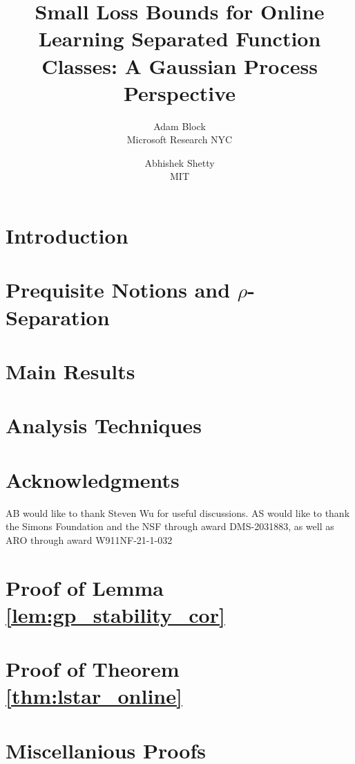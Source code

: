 \documentclass[12pt]{article}
\title{Small Loss Bounds for Online Learning Separated Function Classes: A Gaussian Process Perspective}
\author{Adam Block \\ Microsoft Research NYC \and Abhishek Shetty \\ MIT}
\date{}
\begin{document}
\maketitle

\begin{abstract}%
    
\end{abstract}




\section{Introduction}\label{sec:intro}



\section{Prequisite Notions and $\rho$-Separation}\label{sec:prelims}



\section{Main Results}\label{sec:main}



\section{Analysis Techniques}\label{sec:gp_stability}


\section*{Acknowledgments}
AB would like to thank Steven Wu for useful discussions. AS would like to thank the Simons Foundation and the NSF through award DMS-2031883, as well as ARO through award W911NF-21-1-032

\newpage






\appendix


\clearpage





\section{Proof of Lemma \ref{lem:gp_stability_cor}}\label{app:gp_stability}


\section{Proof of Theorem \ref{thm:lstar_online}}\label{app:online_learning}





\section{Miscellanious Proofs}\label{app:miscellany}





\end{document}

